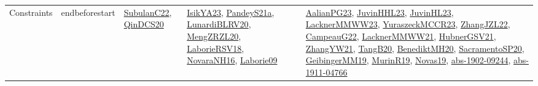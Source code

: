 {\begin{longtable}{llp{6cm}p{6cm}p{6cm}}
Constraints & endbeforestart & \href{articles/SubulanC22.pdf}{SubulanC22}\cite{SubulanC22}, \href{articles/QinDCS20.pdf}{QinDCS20}\cite{QinDCS20} & \href{articles/IsikYA23.pdf}{IsikYA23}\cite{IsikYA23}, \href{articles/PandeyS21a.pdf}{PandeyS21a}\cite{PandeyS21a}, \href{articles/LunardiBLRV20.pdf}{LunardiBLRV20}\cite{LunardiBLRV20}, \href{articles/MengZRZL20.pdf}{MengZRZL20}\cite{MengZRZL20}, \href{articles/LaborieRSV18.pdf}{LaborieRSV18}\cite{LaborieRSV18}, \href{articles/NovaraNH16.pdf}{NovaraNH16}\cite{NovaraNH16}, \href{papers/Laborie09.pdf}{Laborie09}\cite{Laborie09} & \href{papers/AalianPG23.pdf}{AalianPG23}\cite{AalianPG23}, \href{papers/JuvinHHL23.pdf}{JuvinHHL23}\cite{JuvinHHL23}, \href{papers/JuvinHL23.pdf}{JuvinHL23}\cite{JuvinHL23}, \href{articles/LacknerMMWW23.pdf}{LacknerMMWW23}\cite{LacknerMMWW23}, \href{articles/YuraszeckMCCR23.pdf}{YuraszeckMCCR23}\cite{YuraszeckMCCR23}, \href{papers/ZhangJZL22.pdf}{ZhangJZL22}\cite{ZhangJZL22}, \href{articles/CampeauG22.pdf}{CampeauG22}\cite{CampeauG22}, \href{papers/LacknerMMWW21.pdf}{LacknerMMWW21}\cite{LacknerMMWW21}, \href{articles/HubnerGSV21.pdf}{HubnerGSV21}\cite{HubnerGSV21}, \href{articles/ZhangYW21.pdf}{ZhangYW21}\cite{ZhangYW21}, \href{papers/TangB20.pdf}{TangB20}\cite{TangB20}, \href{articles/BenediktMH20.pdf}{BenediktMH20}\cite{BenediktMH20}, \href{articles/SacramentoSP20.pdf}{SacramentoSP20}\cite{SacramentoSP20}, \href{papers/GeibingerMM19.pdf}{GeibingerMM19}\cite{GeibingerMM19}, \href{papers/MurinR19.pdf}{MurinR19}\cite{MurinR19}, \href{articles/Novas19.pdf}{Novas19}\cite{Novas19}, \href{articles/abs-1902-09244.pdf}{abs-1902-09244}\cite{abs-1902-09244}, \href{articles/abs-1911-04766.pdf}{abs-1911-04766}\cite{abs-1911-04766}\\

\end{longtable}}
